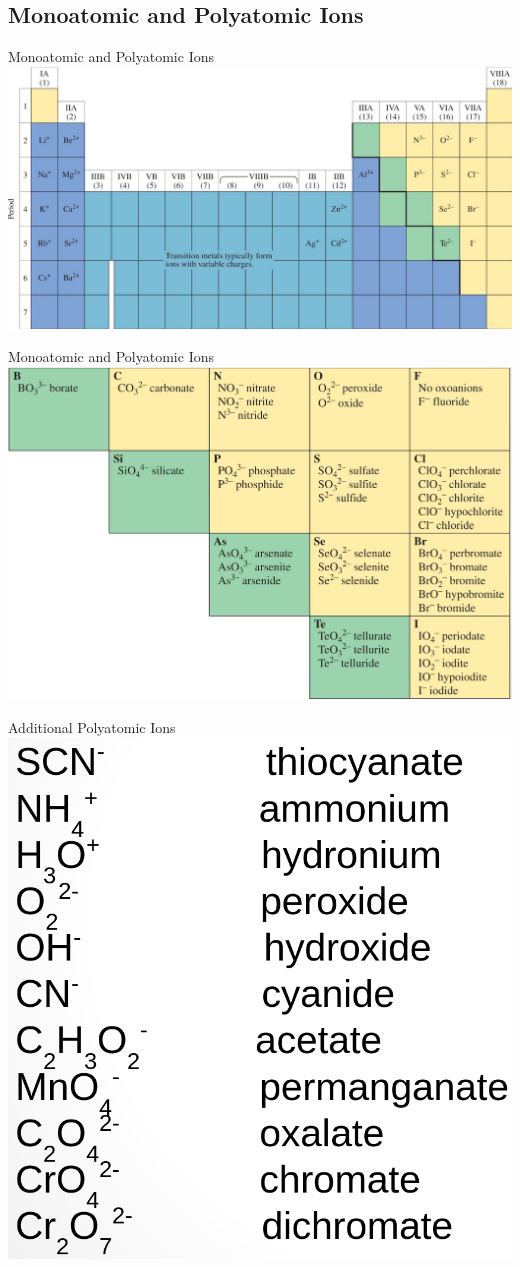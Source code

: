 \documentclass[11pt]{beamer}
\begin{document}
\subsection{Monoatomic and Polyatomic Ions}

\begin{frame}{Monoatomic and Polyatomic Ions}
  \centering
  \includegraphics[width=\linewidth]{monoatomic_ion}
\end{frame}

\begin{frame}{Monoatomic and Polyatomic Ions}
  \centering
  \includegraphics[width=\linewidth]{polyatomic_ion}
\end{frame}

\begin{frame}{Additional Polyatomic Ions}
  \centering
  \includegraphics[width=0.7\linewidth]{more_poly_ions}
\end{frame}
\end{document}
